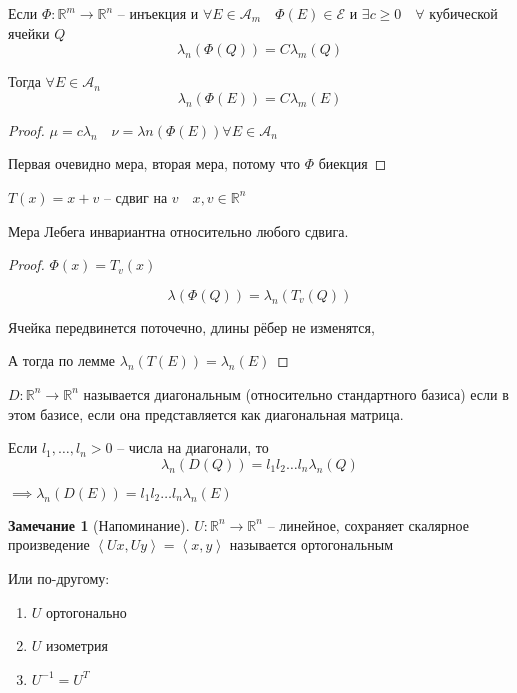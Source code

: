 \documentclass{book}
\newcommand\R{\ensuremath{\mathbb{R}}}
\theoremstyle{definition}
\newtheorem*{note}{Замечание}
\begin{document}
\begin{corollary}
    Если $\Phi: \R^m \to \R^n$ -- инъекция и $\forall E\in \mathcal A_m\quad \Phi\left( E \right) \in \mathcal E$ и $\exists c\geqslant 0\quad \forall $ кубической ячейки $Q$ \[\lambda_n\left( \Phi(Q) \right)=C\lambda_m(Q) \]

    Тогда $\forall E\in \mathcal A_n$ \[\lambda_n\left( \Phi(E) \right) = C\lambda_m(E)\]
\end{corollary}
\begin{proof}
    $\mu = c\lambda_n\quad \nu = \lambda n\left( \Phi(E) \right) \forall E\in \mathcal A_n$

    Первая очевидно мера, вторая мера, потому что $\Phi$ биекция
\end{proof}

\begin{definition}
    $T(x) = x + v$ -- сдвиг на  $v\quad x, v\in \R^n$
\end{definition}

\begin{statement}
    Мера Лебега инвариантна относительно любого сдвига.
\end{statement}
\begin{proof}
    $\Phi(x) = T_v(x)$

    \[\lambda\left( \Phi(Q) \right) =\lambda_n\left( T_v\left( Q \right)  \right) \]

    Ячейка передвинется поточечно, длины рёбер не изменятся, 

    А тогда по лемме $\lambda_n\left( T(E) \right)  = \lambda_n(E)$
\end{proof}

\begin{definition}
    $D:\R^n \to \R^n$ называется диагональным (относительно стандартного базиса) если в этом базисе, если она представляется как диагональная матрица.
\end{definition}
\begin{statement}
    Если $l_1, \ldots, l_n >0$ -- числа на диагонали, то \[\lambda_n\left( D(Q) \right)  = l_1l_2\ldots l_n \lambda_n(Q)\]

    $\implies \lambda_n\left( D(E) \right)  = l_1l_2\ldots l_n \lambda_n(E)$
\end{statement}

\begin{note}
    [Напоминание]

    $U: \R^n \to \R^n$ -- линейное, сохраняет скалярное произведение $\left<Ux, Uy \right> = \left<x, y \right>$ называется ортогональным

    Или по-другому:

    \begin{enumerate}
        \item $U$ ортогонально
        \item $U$ изометрия
        \item  $U^{-1} = U^T$
    \end{enumerate}
\end{note}
\end{document}
